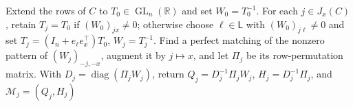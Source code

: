 Extend the rows of \(C\) to \(T_0\in\operatorname{GL}_n(\mathbb R)\) and set \(W_0=T_0^{-1}\). For each \(j\in J_x(C)\), retain \(T_j=T_0\) if \((W_0)_{jx}\ne0\); otherwise choose \(\ell\in\mathsf L\) with \((W_0)_{j\ell}\ne0\) and set \(T_j=(I_n+e_\ell e_x^\top)T_0\), \(W_j=T_j^{-1}\). Find a perfect matching of the nonzero pattern of \((W_j)_{-j,-x}\), augment it by \(j\mapsto x\), and let \(\Pi_j\) be its row-permutation matrix. With \(D_j=\operatorname{diag}(\Pi_jW_j)\), return \(Q_j=D_j^{-1}\Pi_jW_j\), \(H_j=D_j^{-1}\Pi_j\), and \(\mathcal M_j=(Q_j,H_j)\)